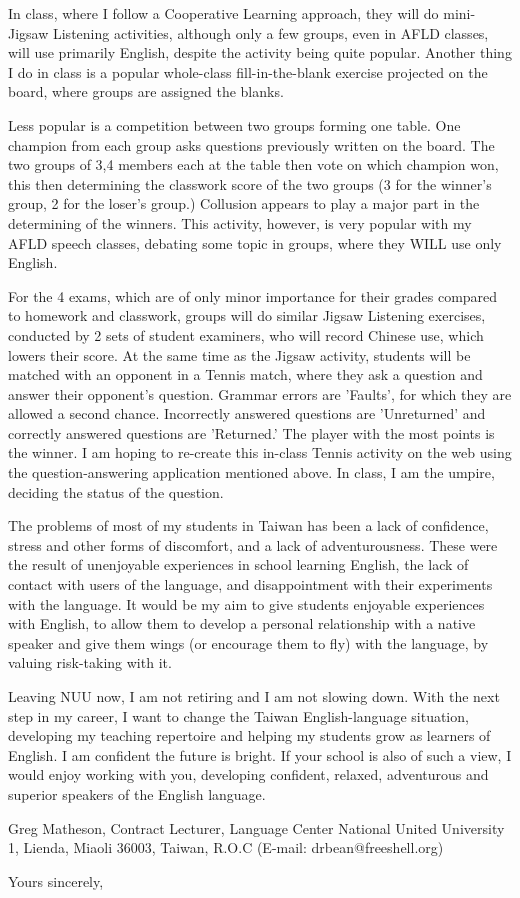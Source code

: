 \documentclass{letter}
\begin{document}
\begin{letter}
In class, where I follow a Cooperative Learning approach, they will do mini-Jigsaw Listening activities, although only a few groups, even in AFLD classes, will use primarily English, despite the activity being quite popular. Another thing I do in class is a popular whole-class fill-in-the-blank exercise projected on the board, where groups are assigned the blanks.

Less popular is a competition between two groups forming one table. One champion from each group asks questions previously written on the board. The two groups of 3,4 members each at the table then vote on which champion won, this then determining the classwork score of the two groups (3 for the winner's group, 2 for the loser's group.) Collusion appears to play a major part in the determining of the winners. This activity, however, is very popular with my AFLD speech classes, debating some topic in groups, where they WILL use only English.

For the 4 exams, which are of only minor importance for their grades compared to homework and classwork, groups will do similar Jigsaw Listening exercises, conducted by 2 sets of student examiners, who will record Chinese use, which lowers their score. At the same time as the Jigsaw activity, students will be matched with an opponent in a Tennis match, where they ask a question and answer their opponent's question. Grammar errors are 'Faults', for which they are allowed a second chance. Incorrectly answered questions are 'Unreturned' and correctly answered questions are 'Returned.' The player with the most points is the winner. I am hoping to re-create this in-class Tennis activity on the web using the question-answering application mentioned above. In class, I am the umpire, deciding the status of the question. 

The problems of most of my students in Taiwan has been a lack of confidence, stress and other forms of discomfort, and a lack of adventurousness. These were the result of unenjoyable experiences in school learning English, the lack of contact with users of the language, and disappointment with their experiments with the language. It would be my aim to give students enjoyable experiences with English, to allow them to develop a personal relationship with a native speaker and give them wings (or encourage them to fly) with the language, by valuing risk-taking with it. 

Leaving NUU now, I am not retiring and I am not slowing down. With the next step in my career, I want to change the Taiwan English-language situation, developing my teaching repertoire and helping my students grow as learners of English. I am confident the future is bright. If your school is also of such a view, I would enjoy working with you, developing confident, relaxed, adventurous and superior speakers of the English language.

Greg Matheson,
Contract Lecturer,
Language Center
National United University
1, Lienda, Miaoli 36003, Taiwan, R.O.C
(E-mail: drbean@freeshell.org)

\closing{Yours sincerely,}


\end{letter}
\end{document}
